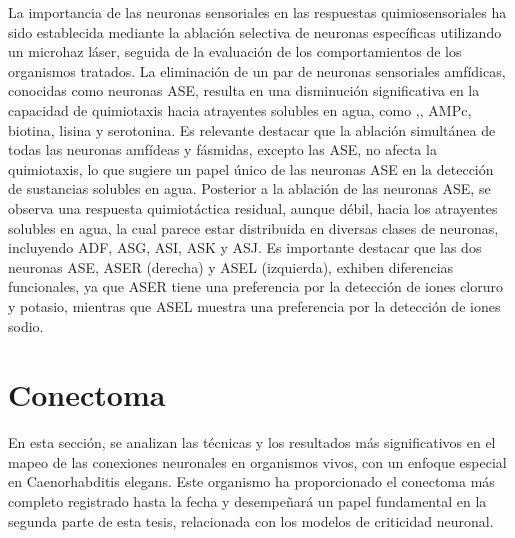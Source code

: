 La importancia de las neuronas sensoriales en las respuestas quimiosensoriales ha sido establecida mediante la ablación selectiva de neuronas específicas utilizando un microhaz láser, seguida de la evaluación de los comportamientos de los organismos tratados. La eliminación de un par de neuronas sensoriales amfídicas, conocidas como neuronas ASE, resulta en una disminución significativa en la capacidad de quimiotaxis hacia atrayentes solubles en agua, como ,, AMPc, biotina, lisina y serotonina.  Es relevante destacar que la ablación simultánea de todas las neuronas amfídeas y fásmidas, excepto las ASE, no afecta la quimiotaxis, lo que sugiere un papel único de las neuronas ASE en la detección de sustancias solubles en agua. Posterior a la ablación de las neuronas ASE, se observa una respuesta quimiotáctica residual, aunque débil, hacia los atrayentes solubles en agua, la cual parece estar distribuida en diversas clases de neuronas, incluyendo ADF, ASG, ASI, ASK y ASJ. Es importante destacar que las dos neuronas ASE, ASER (derecha) y ASEL (izquierda), exhiben diferencias funcionales, ya que ASER tiene una preferencia por la detección de iones cloruro y potasio, mientras que ASEL muestra una preferencia por la detección de iones sodio.





\section{Conectoma}\label{sec:conectoma}



En esta sección, se analizan las técnicas y los resultados más significativos en el mapeo de las conexiones neuronales en organismos vivos, con un enfoque especial en Caenorhabditis elegans. Este organismo ha proporcionado el conectoma más completo registrado hasta la fecha y desempeñará un papel fundamental en la segunda parte de esta tesis, relacionada con los modelos de criticidad neuronal.

